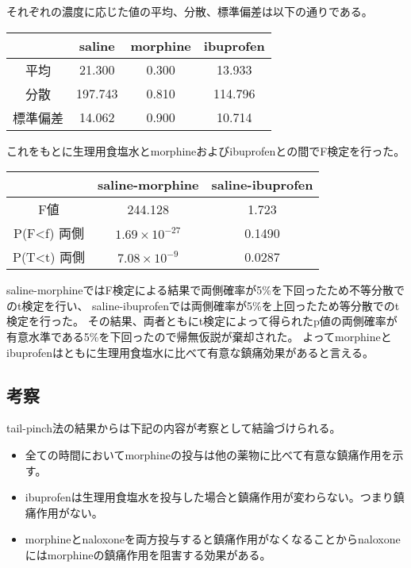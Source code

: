 \documentclass[a4paper,papersize,dvipdfmx]{jsarticle}
\begin{document}
それぞれの濃度に応じた値の平均、分散、標準偏差は以下の通りである。

\begin{table}[H]
\centering
\begin{tabular}{|c|c|c|c|}
\hline
& saline  & morphine & ibuprofen \\ \hline
平均   & 21.300  & 0.300    & 13.933    \\ \hline
分散   & 197.743 & 0.810    & 114.796   \\ \hline
標準偏差 & 14.062  & 0.900    & 10.714    \\ \hline
\end{tabular}
\end{table}

これをもとに生理用食塩水とmorphineおよびibuprofenとの間でF検定を行った。

\begin{table}[H]
\centering
\begin{tabular}{|c|c|c|}
\hline
& saline-morphine & saline-ibuprofen \\ \hline
F値                  & 244.128         & 1.723            \\ \hline
P(F\textless{}f) 両側 & $1.69 \times 10^{-27}$     & 0.1490         \\ \hline
P(T\textless{}t) 両側 & $7.08 \times 10^{-9}$     & 0.0287         \\ \hline
\end{tabular}
\end{table}

saline-morphineではF検定による結果で両側確率が5\%を下回ったため不等分散でのt検定を行い、
saline-ibuprofenでは両側確率が5\%を上回ったため等分散でのt検定を行った。
その結果、両者ともにt検定によって得られたp値の両側確率が有意水準である5\%を下回ったので帰無仮説が棄却された。
よってmorphineとibuprofenはともに生理用食塩水に比べて有意な鎮痛効果があると言える。


\subsection*{考察}

tail-pinch法の結果からは下記の内容が考察として結論づけられる。
\begin{itemize}
\item 全ての時間においてmorphineの投与は他の薬物に比べて有意な鎮痛作用を示す。
\item ibuprofenは生理用食塩水を投与した場合と鎮痛作用が変わらない。つまり鎮痛作用がない。
\item morphineとnaloxoneを両方投与すると鎮痛作用がなくなることからnaloxoneにはmorphineの鎮痛作用を阻害する効果がある。
\end{itemize}
\end{document}
